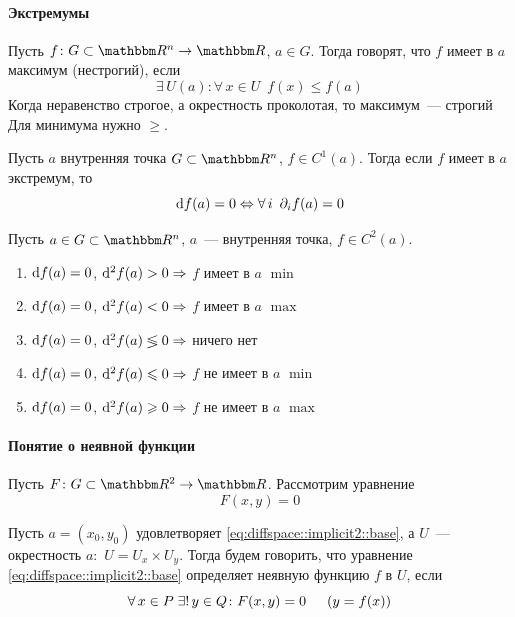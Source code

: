 \documentclass[12pt,timbord]{../../../notes}
\begin{document}
\paragraph{Экстремумы}
\label{par:diffspace::extrema}

\begin{defn}\label{defn:diffspace::extrema}
  Пусть $f\colon G \subset \R^n \to \R$, $a\in G$. Тогда говорят, что $f$ имеет в $a$ максимум (нестрогий), если
  \[
    \exists\, U(a) \colon \forall\, x \in U \;\: f(x) \leqslant f(a)
  \]
  Когда неравенство строгое, а окрестность проколотая, то максимум~--- строгий
  Для минимума нужно $\geqslant$.
\end{defn}

\begin{thrm}\label{thrm:diffspace::extrema::ness}
  Пусть $a$ внутренняя точка $G \subset \R^n$, $f\in C^1(a)$. Тогда если $f$ имеет в $a$ экстремум, то
  \[
    \mathrm{d} f(a) = 0 \Leftrightarrow \forall\,i \;\: \partial_i f(a) = 0
  \]
\end{thrm}

\begin{thrm}\label{thrm:diffspace::extrema::suff}
  Пусть $a\in G \subset \R^n$, $a$~--- внутренняя точка, $f\in C^2(a)$.
  \begin{enumerate}
    \item $\mathrm{d} f(a) = 0$, $\mathrm{d}^2 f(a) > 0 \Rightarrow$ $f$ имеет в $a$ $\min$
    \item $\mathrm{d} f(a) = 0$, $\mathrm{d}^2 f(a) < 0 \Rightarrow$ $f$ имеет в $a$ $\max$
    \item $\mathrm{d} f(a) = 0$, $\mathrm{d}^2 f(a) \lessgtr 0 \Rightarrow$ ничего нет
    \item $\mathrm{d} f(a) = 0$, $\mathrm{d}^2 f(a) \leqslant 0 \Rightarrow$ $f$ не имеет в $a$ $\min$
    \item $\mathrm{d} f(a) = 0$, $\mathrm{d}^2 f(a) \geqslant 0 \Rightarrow$ $f$ не имеет в $a$ $\max$
  \end{enumerate}
\end{thrm}

\paragraph{Понятие о неявной функции}
\label{par:diffspace::implicit2}

\begin{defn}\label{defn:diffspace::implicit2}
  Пусть $F\colon G \subset \R^2 \to \R$. Рассмотрим уравнение
  \begin{equation}
    \label{eq:diffspace::implicit2::base}
    F(x, y) = 0
  \end{equation}

  Пусть $a =(x_0, y_0)$ удовлетворяет \eqref{eq:diffspace::implicit2::base}, 
  а $U$~--- окрестность $a \colon$ $U = U_x \times U_y$.
  Тогда будем говорить, что уравнение \eqref{eq:diffspace::implicit2::base} определяет неявную 
  функцию $f$ в $U$, если
  \[
    \forall\, x\in P \; \exists!\, y\in Q \colon F(x,y) = 0 \hspace{1.5em} (y = f(x))
  \]
\end{defn}
\end{document}

